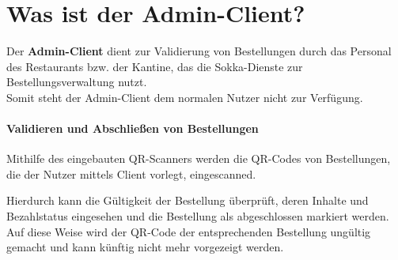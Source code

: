 \section{Was ist der Admin-Client?}

Der \textbf{Admin-Client} dient zur Validierung von Bestellungen durch das Personal des Restaurants
bzw. der Kantine, das die Sokka-Dienste zur Bestellungsverwaltung nutzt.\\
Somit steht der Admin-Client dem normalen Nutzer nicht zur Verfügung.

\paragraph{Validieren und Abschließen von Bestellungen}

Mithilfe des eingebauten QR-Scanners werden die QR-Codes von Bestellungen, die der Nutzer
mittels Client vorlegt, eingescanned.

Hierdurch kann die Gültigkeit der Bestellung überprüft, deren Inhalte und Bezahlstatus eingesehen
und die Bestellung als abgeschlossen markiert werden.\\
Auf diese Weise wird der QR-Code der entsprechenden Bestellung ungültig gemacht und kann künftig
nicht mehr vorgezeigt werden.


